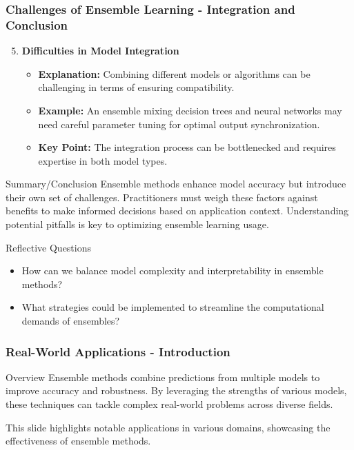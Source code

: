 \documentclass[aspectratio=169]{beamer}
\begin{document}
\begin{frame}[fragile]
    \frametitle{Challenges of Ensemble Learning - Integration and Conclusion}
    \begin{enumerate}
        \setcounter{enumi}{4}
        \item \textbf{Difficulties in Model Integration}
            \begin{itemize}
                \item \textbf{Explanation:} Combining different models or algorithms can be challenging in terms of ensuring compatibility.
                \item \textbf{Example:} An ensemble mixing decision trees and neural networks may need careful parameter tuning for optimal output synchronization.
                \item \textbf{Key Point:} The integration process can be bottlenecked and requires expertise in both model types.
            \end{itemize}
    \end{enumerate}
    
    \begin{block}{Summary/Conclusion}
        Ensemble methods enhance model accuracy but introduce their own set of challenges. Practitioners must weigh these factors against benefits to make informed decisions based on application context. Understanding potential pitfalls is key to optimizing ensemble learning usage.
    \end{block}
    
    \begin{block}{Reflective Questions}
        \begin{itemize}
            \item How can we balance model complexity and interpretability in ensemble methods?
            \item What strategies could be implemented to streamline the computational demands of ensembles?
        \end{itemize}
    \end{block}
\end{frame}

\begin{frame}[fragile]
    \frametitle{Real-World Applications - Introduction}
    \begin{block}{Overview}
        Ensemble methods combine predictions from multiple models to improve accuracy and robustness. 
        By leveraging the strengths of various models, these techniques can tackle complex real-world problems across diverse fields.
    \end{block}
    This slide highlights notable applications in various domains, showcasing the effectiveness of ensemble methods.
\end{frame}
\end{document}
